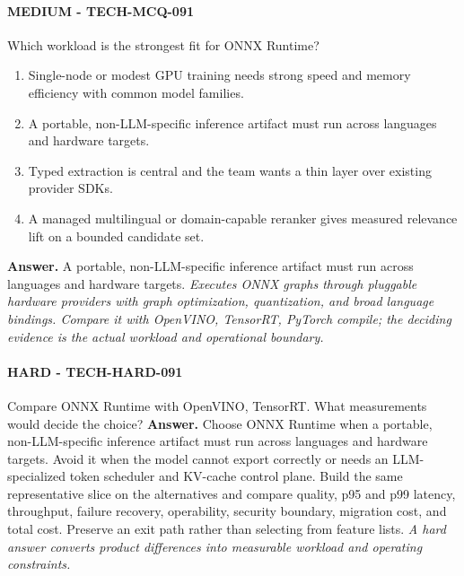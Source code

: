 \paragraph{MEDIUM - TECH-MCQ-091} Which workload is the strongest fit for ONNX Runtime?
\begin{enumerate}[label=\Alph*.]
\item Single-node or modest GPU training needs strong speed and memory efficiency with common model families.
\item A portable, non-LLM-specific inference artifact must run across languages and hardware targets.
\item Typed extraction is central and the team wants a thin layer over existing provider SDKs.
\item A managed multilingual or domain-capable reranker gives measured relevance lift on a bounded candidate set.
\end{enumerate}
\textbf{Answer.} A portable, non-LLM-specific inference artifact must run across languages and hardware targets.
\textit{Executes ONNX graphs through pluggable hardware providers with graph optimization, quantization, and broad language bindings. Compare it with OpenVINO, TensorRT, PyTorch compile; the deciding evidence is the actual workload and operational boundary.}
\paragraph{HARD - TECH-HARD-091} Compare ONNX Runtime with OpenVINO, TensorRT. What measurements would decide the choice?
\textbf{Answer.} Choose ONNX Runtime when a portable, non-LLM-specific inference artifact must run across languages and hardware targets. Avoid it when the model cannot export correctly or needs an LLM-specialized token scheduler and KV-cache control plane. Build the same representative slice on the alternatives and compare quality, p95 and p99 latency, throughput, failure recovery, operability, security boundary, migration cost, and total cost. Preserve an exit path rather than selecting from feature lists.
\textit{A hard answer converts product differences into measurable workload and operating constraints.}
